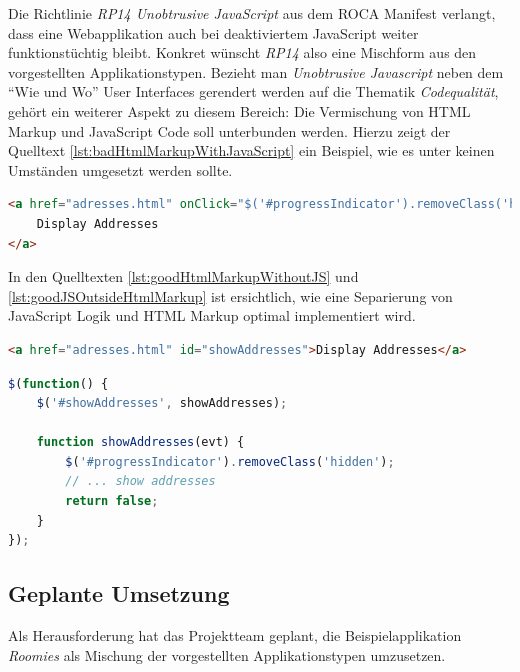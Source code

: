 Die Richtlinie \emph{RP14 Unobtrusive JavaScript} aus dem ROCA Manifest verlangt, dass eine Webapplikation auch bei deaktiviertem JavaScript weiter funktionstüchtig bleibt. Konkret wünscht \emph{RP14} also eine Mischform aus den vorgestellten Applikationstypen.
\newline\newline
Bezieht man \emph{Unobtrusive Javascript} neben dem ``Wie und Wo'' User Interfaces gerendert werden auf die Thematik \emph{Codequalität}, gehört ein weiterer Aspekt zu diesem Bereich: Die Vermischung von HTML Markup und JavaScript Code soll unterbunden werden. Hierzu zeigt der Quelltext \ref{lst:badHtmlMarkupWithJavaScript} ein Beispiel, wie es unter keinen Umständen umgesetzt werden sollte.

\begin{lstlisting}[language=HTML, caption={Beispiel Vermischung von HTML Markup und JavaScript}, label={lst:badHtmlMarkupWithJavaScript}]
<a href="adresses.html" onClick="$('#progressIndicator').removeClass('hidden');showAddresses();return false;">
	Display Addresses
</a>
\end{lstlisting}

In den Quelltexten \ref{lst:goodHtmlMarkupWithoutJS} und \ref{lst:goodJSOutsideHtmlMarkup} ist ersichtlich, wie eine Separierung von JavaScript Logik und HTML Markup optimal implementiert wird.

\begin{lstlisting}[language=HTML, caption={Beispiel sauberes HTML Markup ohne JavaScript}, label={lst:goodHtmlMarkupWithoutJS}]
<a href="adresses.html" id="showAddresses">Display Addresses</a>
\end{lstlisting}

\begin{lstlisting}[language=JavaScript, caption={Beispiel Event-Handler in ausgelagerter JavaScript Datei}, label={lst:goodJSOutsideHtmlMarkup}]
$(function() {
	$('#showAddresses', showAddresses);

	function showAddresses(evt) {
		$('#progressIndicator').removeClass('hidden');
		// ... show addresses
		return false;
	}
});
\end{lstlisting}


\subsection*{Geplante Umsetzung}

Als Herausforderung hat das Projektteam geplant, die Beispielapplikation \emph{Roomies} als Mischung der vorgestellten Applikationstypen umzusetzen.

